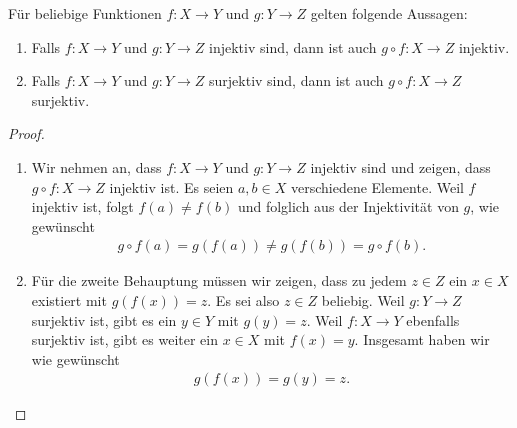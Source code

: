%
%

\begin{lm}\label{lm: komposition inj surj}
    Für beliebige Funktionen $f:X\to Y$ und $g:Y\to Z$ gelten folgende Aussagen:
    \begin{enumerate}
        \item Falls $f:X\to Y$ und $g:Y\to Z$ injektiv sind, dann ist auch $g\circ f:X\to Z$ injektiv.
        \item Falls $f:X\to Y$ und $g:Y\to Z$ surjektiv sind, dann ist auch $g\circ f:X\to Z$ surjektiv.
    \end{enumerate}
\end{lm}
\begin{proof}
    \begin{enumerate}
        \item Wir nehmen an, dass $f:X\to Y$ und $g:Y\to Z$ injektiv sind und zeigen, dass $g\circ f:X\to Z$ injektiv ist. Es seien $a,b\in X$ verschiedene Elemente. Weil $f$ injektiv ist, folgt $f(a)\neq f(b)$ und folglich aus der Injektivität von $g$, wie gewünscht
        \begin{align*}
            g\circ f(a) = g(f(a))\neq g(f(b))=g\circ f(b).
        \end{align*}
        \item Für die zweite Behauptung müssen wir zeigen, dass zu jedem $z\in Z$ ein $x\in X$ existiert mit $g(f(x))= z$. Es sei also $z\in Z$ beliebig. Weil $g:Y\to Z$ surjektiv ist, gibt es ein $y\in Y$ mit $g(y)=z$. Weil $f:X\to Y$ ebenfalls surjektiv ist, gibt es weiter ein $x\in X$ mit $f(x) = y$. Insgesamt haben wir wie gewünscht
        \begin{align*}
            g(f(x))=g(y)=z.
        \end{align*}
    \end{enumerate}
\end{proof}

